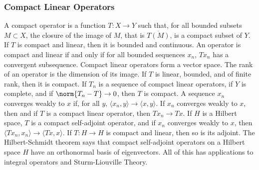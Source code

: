 \documentclass[crop=false,class=article,oneside]{standalone}
\begin{document}
        \subsubsection{Compact Linear Operators}
            A compact operator is a function
            $T:X\rightarrow{Y}$ such that, for all bounded subsets
            $M\subset{X}$, the closure of the image of $M$,
            that is $\overline{T(M)}$, is a compact subset of $Y$.
            If $T$ is compact and linear, then it is bounded and
            continuous. An operator is compact and linear if and only if
            for all bounded sequences $x_{n}$,
            $Tx_{n}$ has a convergent subsequence. Compact linear
            operators form a vector space. The rank of an operator is
            the dimension of its image. If $T$ is linear, bounded, and
            of finite rank, then it is compact.
            If $T_{n}$ is a sequence of compact linear operators, if $Y$ is
            complete, and if $\norm{T_{n}-T}\rightarrow{0}$, then
            $T$ is compact. A sequence $x_{n}$ converges weakly to
            $x$ if, for all $y$,
            $\langle{x_{n},y}\rangle\rightarrow\langle{x,y}\rangle$.
            If $x_{n}$ converges weakly to $x$, then
            and if $T$ is a compact linear operator, then
            $Tx_{n}\rightarrow{Tx}$. If $H$ is a Hilbert space,
            $T$ is a compact self-adjoint operator, and if
            $x_{n}$ converges weakly to $x$, then
            $\langle{Tx_{n},x_{n}}\rangle\rightarrow\langle{Tx,x}\rangle$.
            If $T:H\rightarrow{H}$ is compact and linear, then so
            is its adjoint. The Hilbert-Schmidt theorem says that
            compact self-adjoint operators on a Hilbert space $H$
            have an orthonormal basis of eigenvectors. All of this
            has applications to integral operators and
            Sturm-Liouville Theory.
\end{document}

